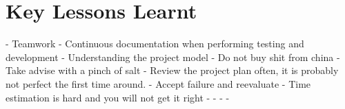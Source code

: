 \section{Key Lessons Learnt}

- Teamwork
- Continuous documentation when performing testing and development
- Understanding the project model
- Do not buy shit from china
- Take advise with a pinch of salt
- Review the project plan often, it is probably not perfect the first time around.
- Accept failure and reevaluate
- Time estimation is hard and you will not get it right
- 
-
-
-
